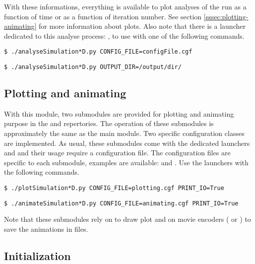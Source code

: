         With these informations, everything is available to plot analyses of the run as a function of time or as a function of iteration number.
        See section \ref{sssec:plotting-animating} for more information about plots. Also note that there is a \python launcher dedicated
        to this analyse process: , to use with one of the following commands.
        \lstset{style=codebash}
        \begin{lstlisting}
$ ./analyseSimulation*D.py CONFIG_FILE=configFile.cgf\end{lstlisting}
        \begin{lstlisting}
$ ./analyseSimulation*D.py OUTPUT_DIR=/output/dir/\end{lstlisting}

    \subsection{Plotting and animating\label{sssec:plotting-animating}}
    \noindent

        With this module, two submodules are provided for plotting and animating purpose in the  and
         repertories. The operation of these submodules is approximately the same as the main module.
        Two specific configuration classes are implemented. As usual, these submodules come with the dedicated \python launchers
         and  and their usage require a configuration file. The configuration
        files are specific to each submodule, examples are available:  and 
        . Use the launchers with the following commands.
        \lstset{style=codebash}
        \begin{lstlisting}
$ ./plotSimulation*D.py CONFIG_FILE=plotting.cgf PRINT_IO=True\end{lstlisting}
        \begin{lstlisting}
$ ./animateSimulation*D.py CONFIG_FILE=animating.cgf PRINT_IO=True\end{lstlisting}

        Note that these submodules rely on \mpl{} to draw plot and on movie encoders (\eg{} \ffmpeg{} or \mencoder{}) to  
        save the animations in files.

    \subsection{Initialization\label{sssec:initialization}}
    \noindent

